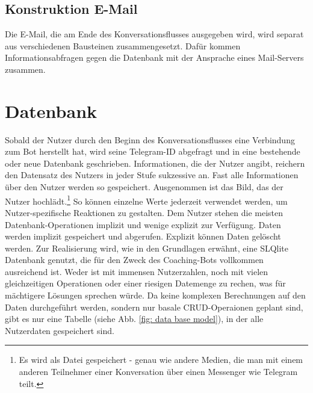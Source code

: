         \subsection{Konstruktion E-Mail}
        Die E-Mail, die am Ende des Konversationsflusses ausgegeben wird, wird separat aus verschiedenen Bausteinen zusammengesetzt. Dafür kommen Informationsabfragen gegen die Datenbank mit der Ansprache eines Mail-Servers zusammen.
        
    
    \section{Datenbank} \label{Realisierung Datenbank}
        Sobald der Nutzer durch den Beginn des Konversationsflusses eine Verbindung zum Bot herstellt hat, wird seine Telegram-ID abgefragt und in eine bestehende oder neue Datenbank geschrieben. Informationen, die der Nutzer angibt, reichern den Datensatz des Nutzers in jeder Stufe sukzessive an. Fast alle Informationen über den Nutzer werden so gespeichert. Ausgenommen ist das Bild, das der Nutzer hochlädt.\footnote{Es wird als Datei gespeichert - genau wie andere Medien, die man mit einem anderen Teilnehmer einer Konversation über einen Messenger wie Telegram teilt.} So können einzelne Werte jederzeit verwendet werden, um Nutzer-spezifische Reaktionen zu gestalten. Dem Nutzer stehen die meisten Datenbank-Operationen implizit und wenige explizit zur Verfügung. Daten werden implizit gespeichert und abgerufen. Explizit können Daten gelöscht werden. Zur Realisierung wird, wie in den Grundlagen erwähnt, eine SLQlite Datenbank genutzt, die für den Zweck des Coaching-Bots vollkommen ausreichend ist. Weder ist mit immensen Nutzerzahlen, noch mit vielen gleichzeitigen Operationen oder einer riesigen Datemenge zu rechen, was für mächtigere Lösungen sprechen würde. Da keine komplexen Berechnungen auf den Daten durchgeführt werden, sondern nur basale CRUD-Operaionen geplant sind, gibt es nur eine Tabelle (siehe Abb. \ref{fig: data base model}), in der alle Nutzerdaten gespeichert sind.
